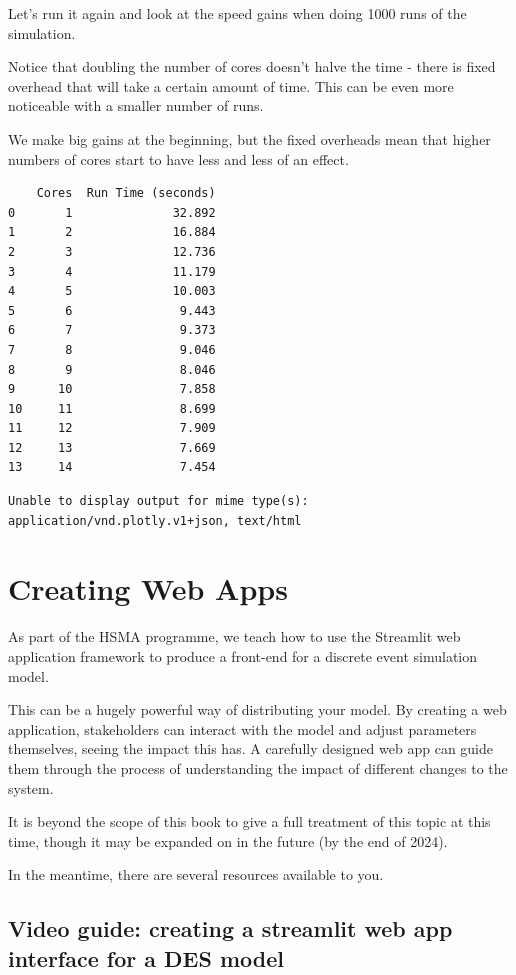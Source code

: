\documentclass[
  letterpaper,
  DIV=11,
  numbers=noendperiod]{scrreprt}
\begin{document}
Let's run it again and look at the speed gains when doing 1000 runs of
the simulation.

Notice that doubling the number of cores doesn't halve the time - there
is fixed overhead that will take a certain amount of time. This can be
even more noticeable with a smaller number of runs.

We make big gains at the beginning, but the fixed overheads mean that
higher numbers of cores start to have less and less of an effect.

\begin{verbatim}
    Cores  Run Time (seconds)
0       1              32.892
1       2              16.884
2       3              12.736
3       4              11.179
4       5              10.003
5       6               9.443
6       7               9.373
7       8               9.046
8       9               8.046
9      10               7.858
10     11               8.699
11     12               7.909
12     13               7.669
13     14               7.454
\end{verbatim}

\begin{verbatim}
Unable to display output for mime type(s): application/vnd.plotly.v1+json, text/html
\end{verbatim}

\chapter{Creating Web Apps}\label{creating-web-apps}

As part of the HSMA programme, we teach how to use the Streamlit web
application framework to produce a front-end for a discrete event
simulation model.

This can be a hugely powerful way of distributing your model. By
creating a web application, stakeholders can interact with the model and
adjust parameters themselves, seeing the impact this has. A carefully
designed web app can guide them through the process of understanding the
impact of different changes to the system.

It is beyond the scope of this book to give a full treatment of this
topic at this time, though it may be expanded on in the future (by the
end of 2024).

In the meantime, there are several resources available to you.

\section{Video guide: creating a streamlit web app interface for a DES
model}\label{video-guide-creating-a-streamlit-web-app-interface-for-a-des-model}
\end{document}
